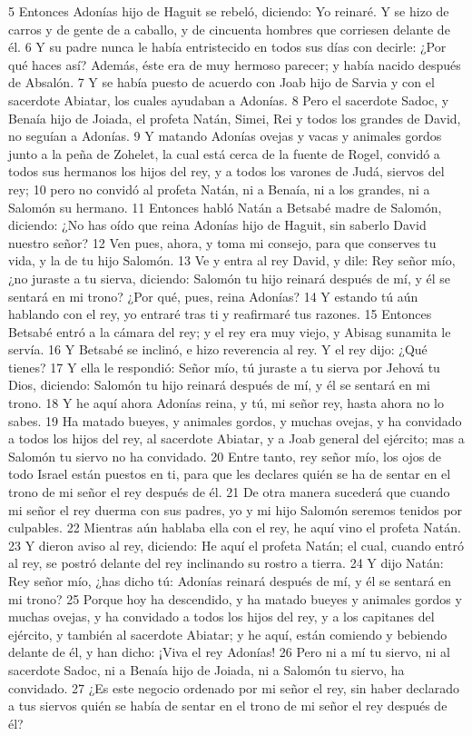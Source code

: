 5 Entonces Adonías hijo de Haguit se rebeló, diciendo: Yo reinaré. Y se hizo de carros y de gente de a caballo, y de cincuenta hombres que corriesen delante de él.
6 Y su padre nunca le había entristecido en todos sus días con decirle: ¿Por qué haces así? Además, éste era de muy hermoso parecer; y había nacido después de Absalón.
7 Y se había puesto de acuerdo con Joab hijo de Sarvia y con el sacerdote Abiatar, los cuales ayudaban a Adonías.
8 Pero el sacerdote Sadoc, y Benaía hijo de Joiada, el profeta Natán, Simei, Rei y todos los grandes de David, no seguían a Adonías.
9 Y matando Adonías ovejas y vacas y animales gordos junto a la peña de Zohelet, la cual está cerca de la fuente de Rogel, convidó a todos sus hermanos los hijos del rey, y a todos los varones de Judá, siervos del rey;
10 pero no convidó al profeta Natán, ni a Benaía, ni a los grandes, ni a Salomón su hermano.
11 Entonces habló Natán a Betsabé madre de Salomón, diciendo: ¿No has oído que reina Adonías hijo de Haguit, sin saberlo David nuestro señor?
12 Ven pues, ahora, y toma mi consejo, para que conserves tu vida, y la de tu hijo Salomón.
13 Ve y entra al rey David, y dile: Rey señor mío, ¿no juraste a tu sierva, diciendo: Salomón tu hijo reinará después de mí, y él se sentará en mi trono? ¿Por qué, pues, reina Adonías?
14 Y estando tú aún hablando con el rey, yo entraré tras ti y reafirmaré tus razones.
15 Entonces Betsabé entró a la cámara del rey; y el rey era muy viejo, y Abisag sunamita le servía.
16 Y Betsabé se inclinó, e hizo reverencia al rey. Y el rey dijo: ¿Qué tienes?
17 Y ella le respondió: Señor mío, tú juraste a tu sierva por Jehová tu Dios, diciendo: Salomón tu hijo reinará después de mí, y él se sentará en mi trono.
18 Y he aquí ahora Adonías reina, y tú, mi señor rey, hasta ahora no lo sabes.
19 Ha matado bueyes, y animales gordos, y muchas ovejas, y ha convidado a todos los hijos del rey, al sacerdote Abiatar, y a Joab general del ejército; mas a Salomón tu siervo no ha convidado.
20 Entre tanto, rey señor mío, los ojos de todo Israel están puestos en ti, para que les declares quién se ha de sentar en el trono de mi señor el rey después de él.
21 De otra manera sucederá que cuando mi señor el rey duerma con sus padres, yo y mi hijo Salomón seremos tenidos por culpables.
22 Mientras aún hablaba ella con el rey, he aquí vino el profeta Natán.
23 Y dieron aviso al rey, diciendo: He aquí el profeta Natán; el cual, cuando entró al rey, se postró delante del rey inclinando su rostro a tierra.
24 Y dijo Natán: Rey señor mío, ¿has dicho tú: Adonías reinará después de mí, y él se sentará en mi trono?
25 Porque hoy ha descendido, y ha matado bueyes y animales gordos y muchas ovejas, y ha convidado a todos los hijos del rey, y a los capitanes del ejército, y también al sacerdote Abiatar; y he aquí, están comiendo y bebiendo delante de él, y han dicho: ¡Viva el rey Adonías!
26 Pero ni a mí tu siervo, ni al sacerdote Sadoc, ni a Benaía hijo de Joiada, ni a Salomón tu siervo, ha convidado.
27 ¿Es este negocio ordenado por mi señor el rey, sin haber declarado a tus siervos quién se había de sentar en el trono de mi señor el rey después de él?
